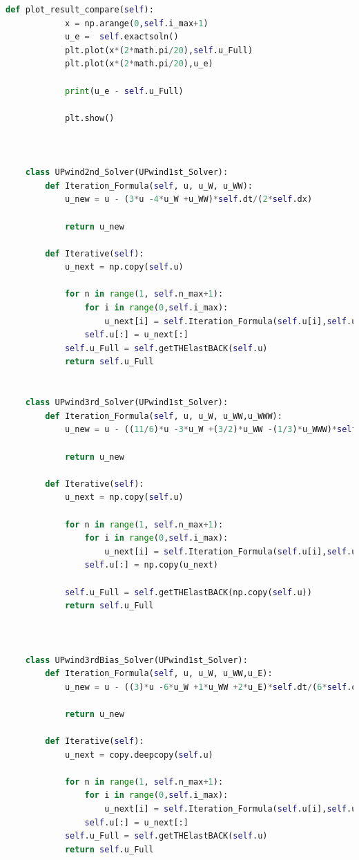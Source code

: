 \documentclass[12pt]{article}
\begin{document}
\begin{scriptsize}
\begin{lstlisting}[language=python,caption={Problem1, Py code for Solvers}]
        def plot_result_compare(self):
            x = np.arange(0,self.i_max+1)
            u_e =  self.exactsoln()
            plt.plot(x*(2*math.pi/20),self.u_Full)
            plt.plot(x*(2*math.pi/20),u_e)
    
            print(u_e - self.u_Full)
    
            plt.show()
    
    
    
    class UPwind2nd_Solver(UPwind1st_Solver):
        def Iteration_Formula(self, u, u_W, u_WW):
            u_new = u - (3*u -4*u_W +u_WW)*self.dt/(2*self.dx)
          
            return u_new
        
        def Iterative(self):
            u_next = np.copy(self.u)
    
            for n in range(1, self.n_max+1):
                for i in range(0,self.i_max):
                    u_next[i] = self.Iteration_Formula(self.u[i],self.u[i-1],self.u[i-2])
                self.u[:] = u_next[:]
            self.u_Full = self.getTHElastBACK(self.u)
            return self.u_Full
    
    
    class UPwind3rd_Solver(UPwind1st_Solver):
        def Iteration_Formula(self, u, u_W, u_WW,u_WWW):
            u_new = u - ((11/6)*u -3*u_W +(3/2)*u_WW -(1/3)*u_WWW)*self.dt/(self.dx)
          
            return u_new
        
        def Iterative(self):
            u_next = np.copy(self.u)
    
            for n in range(1, self.n_max+1):
                for i in range(0,self.i_max):
                    u_next[i] = self.Iteration_Formula(self.u[i],self.u[i-1],self.u[i-2],self.u[i-3])
                self.u[:] = np.copy(u_next)
            
            self.u_Full = self.getTHElastBACK(np.copy(self.u))
            return self.u_Full
        
        
    
    class UPwind3rdBias_Solver(UPwind1st_Solver):
        def Iteration_Formula(self, u, u_W, u_WW,u_E):
            u_new = u - ((3)*u -6*u_W +1*u_WW +2*u_E)*self.dt/(6*self.dx)
          
            return u_new
        
        def Iterative(self):
            u_next = copy.deepcopy(self.u)
    
            for n in range(1, self.n_max+1):
                for i in range(0,self.i_max):
                    u_next[i] = self.Iteration_Formula(self.u[i],self.u[i-1],self.u[i-2],self.u[(i+1)%(self.i_max)])
                self.u[:] = u_next[:]
            self.u_Full = self.getTHElastBACK(self.u)
            return self.u_Full
        

\end{lstlisting}
\end{scriptsize}
\end{document}
